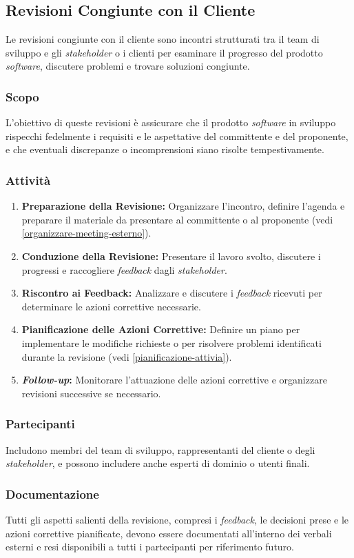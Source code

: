 \subsection{Revisioni Congiunte con il Cliente}

Le revisioni congiunte con il cliente sono incontri strutturati tra il team di
sviluppo e gli \textit{stakeholder} o i clienti per esaminare il progresso del
prodotto \textit{software}, discutere problemi e trovare soluzioni congiunte.

\subsubsection{Scopo}
L'obiettivo di queste revisioni è assicurare che il prodotto \textit{software}
in sviluppo rispecchi fedelmente i requisiti e le aspettative del committente e
del proponente, e che eventuali discrepanze o incomprensioni siano risolte
tempestivamente.

\subsubsection{Attività}
\begin{enumerate}
	\item \textbf{Preparazione della Revisione:} Organizzare l'incontro,
	      definire l'agenda e preparare il materiale da presentare al
	      committente o al proponente (vedi
	      \autoref{organizzare-meeting-esterno}).
	\item \textbf{Conduzione della Revisione:} Presentare il lavoro svolto,
	      discutere i progressi e raccogliere \textit{feedback} dagli
	      \textit{stakeholder}.
	\item \textbf{Riscontro ai Feedback:} Analizzare e discutere i
	      \textit{feedback} ricevuti per determinare le azioni correttive
	      necessarie.
	\item \textbf{Pianificazione delle Azioni Correttive:} Definire un piano per
	      implementare le modifiche richieste o per risolvere problemi
	      identificati durante la revisione (vedi
	      \autoref{pianificazione-attivia}).
	\item \textbf{\textit{Follow-up}:} Monitorare l'attuazione delle azioni
	      correttive e organizzare revisioni successive se necessario.
\end{enumerate}

\subsubsection{Partecipanti}
Includono membri del team di sviluppo, rappresentanti del cliente o degli
\textit{stakeholder}, e possono includere anche esperti di dominio o utenti
finali.

\subsubsection{Documentazione}
Tutti gli aspetti salienti della revisione, compresi i \textit{feedback}, le
decisioni prese e le azioni correttive pianificate, devono essere documentati
all'interno dei verbali esterni e resi disponibili a tutti i partecipanti per
riferimento futuro.

